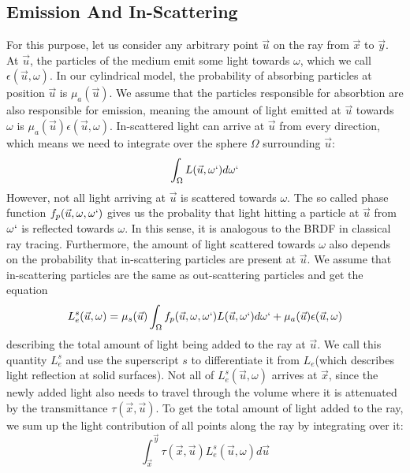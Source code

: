 \subsection{Emission And In-Scattering}
For this purpose, let us consider any arbitrary point $\vec{u}$ on the ray from $\vec{x}$ to $\vec{y}$.
At $\vec{u}$, the particles of the medium emit some light towards $\omega$, which we call $\epsilon (\vec{u}, \omega )$. In our cylindrical model, the probability of absorbing particles at position $\vec{u}$ is ${\mu}_a(\vec{u})$. We assume that the particles responsible for absorbtion are also responsible for emission, meaning the amount of light emitted at $\vec{u}$ towards $\omega$ is ${\mu}_a(\vec{u})\epsilon (\vec{u}, \omega )$.
In-scattered light can arrive at $\vec{u}$ from every direction, which means we need to integrate over the sphere $\Omega$ surrounding $\vec{u}$:
\begin{equation}
\int_{\Omega} L(\vec{u}, \omega `)d\omega `
\end{equation}
However, not all light arriving at $\vec{u}$ is scattered towards $\omega $. The so called phase function $f_p(\vec{u}, \omega , \omega `)$ gives us the probality that light hitting a particle at $\vec{u}$ from $\omega `$ is reflected towards $\omega$. In this sense, it is analogous to the BRDF in classical ray tracing. Furthermore, the amount of light scattered towards $\omega $ also depends on the probability that in-scattering particles are present at $\vec{u}$. We assume that in-scattering particles are the same as out-scattering particles and get the equation
\begin{equation}
L_e^s(\vec{u}, \omega ) = {\mu}_s(\vec{u})\int_{\Omega} f_p(\vec{u}, \omega , \omega `)L(\vec{u}, \omega `)d\omega `  + {\mu}_a(\vec{u})\epsilon (\vec{u}, \omega )
\end{equation}
describing the total amount of light being added to the ray at $\vec{u}$. We call this quantity $L_e^s$ and use the superscript $s$ to differentiate it from $L_e$(which describes light reflection at solid surfaces).
Not all of $L_e^s(\vec{u}, \omega )$ arrives at $\vec{x}$, since the newly added light also needs to travel through the volume where it is attenuated by the transmittance $\tau (\vec{x}, \vec{u})$.
To get the total amount of light added to the ray, we sum up the light contribution of all points along the ray by integrating over it:
\begin{equation}
\int_{\vec{x}}^{\vec{y}} \tau(\vec{x}, \vec{u})L_e^s(\vec{u}, \omega )d\vec{u}
\end{equation}
